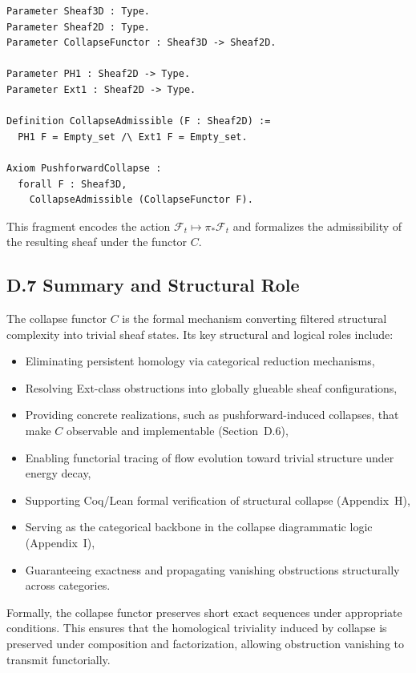 \documentclass[11pt]{article}
\begin{document}
\begin{lstlisting}[language=Coq, caption={Coq Encoding of Pushforward-Based Collapse}]
Parameter Sheaf3D : Type.
Parameter Sheaf2D : Type.
Parameter CollapseFunctor : Sheaf3D -> Sheaf2D.

Parameter PH1 : Sheaf2D -> Type.
Parameter Ext1 : Sheaf2D -> Type.

Definition CollapseAdmissible (F : Sheaf2D) :=
  PH1 F = Empty_set /\ Ext1 F = Empty_set.

Axiom PushforwardCollapse :
  forall F : Sheaf3D,
    CollapseAdmissible (CollapseFunctor F).
\end{lstlisting}

This fragment encodes the action \( \mathcal{F}_t \mapsto \pi_* \mathcal{F}_t \) and formalizes the admissibility of the resulting sheaf under the functor \( C \).

\subsection{D.7 Summary and Structural Role}
\label{sec:collapse-summary}

The collapse functor \( C \) is the formal mechanism converting filtered structural complexity into trivial sheaf states. Its key structural and logical roles include:

\begin{itemize}
  \item Eliminating persistent homology via categorical reduction mechanisms,
  \item Resolving Ext-class obstructions into globally glueable sheaf configurations,
  \item Providing concrete realizations, such as pushforward-induced collapses, that make \( C \) observable and implementable (Section~D.6),
  \item Enabling functorial tracing of flow evolution toward trivial structure under energy decay,
  \item Supporting Coq/Lean formal verification of structural collapse (Appendix~H),
  \item Serving as the categorical backbone in the collapse diagrammatic logic (Appendix~I),
  \item Guaranteeing exactness and propagating vanishing obstructions structurally across categories.
\end{itemize}

Formally, the collapse functor preserves short exact sequences under appropriate conditions. This ensures that the homological triviality induced by collapse is preserved under composition and factorization, allowing obstruction vanishing to transmit functorially.
\end{document}
